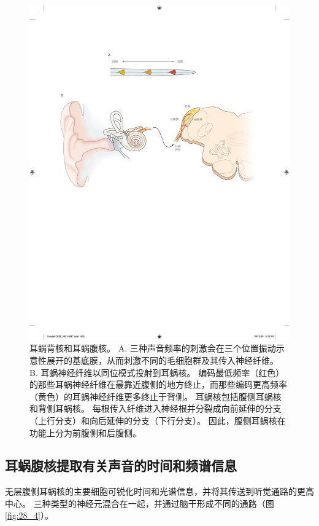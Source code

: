 \begin{figure}[htbp]
	\centering
	\includegraphics[width=0.95\linewidth]{chap28/fig_28_3}
	\caption{耳蜗背核和耳蜗腹核。 
		A. 三种声音频率的刺激会在三个位置振动示意性展开的基底膜，从而刺激不同的毛细胞群及其传入神经纤维。
		B. 耳蜗神经纤维以同位模式投射到耳蜗核。
		编码最低频率（红色）的那些耳蜗神经纤维在最靠近腹侧的地方终止，而那些编码更高频率（黄色）的耳蜗神经纤维更多终止于背侧。
		耳蜗核包括腹侧耳蜗核和背侧耳蜗核。
		每根传入纤维进入神经根并分裂成向前延伸的分支（上行分支）和向后延伸的分支（下行分支）。
		因此，腹侧耳蜗核在功能上分为前腹侧和后腹侧。}
	\label{fig:28_3}
\end{figure}



\subsection{耳蜗腹核提取有关声音的时间和频谱信息}

无层腹侧耳蜗核的主要细胞可锐化时间和光谱信息，并将其传送到听觉通路的更高中心。 
三种类型的神经元混合在一起，并通过脑干形成不同的通路（图 \ref{fig:28_4}）。

